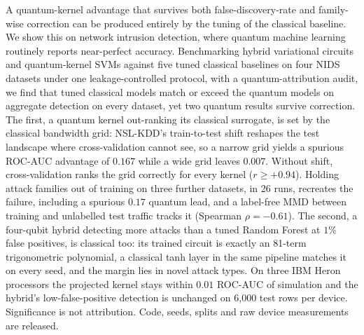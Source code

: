 A quantum-kernel advantage that survives both false-discovery-rate and family-wise correction can be
produced entirely by the tuning of the classical baseline. We show this on network intrusion detection,
where quantum machine learning routinely reports near-perfect accuracy. Benchmarking hybrid variational
circuits and quantum-kernel SVMs against five tuned classical baselines on four NIDS datasets under one
leakage-controlled protocol, with a quantum-attribution audit, we find that tuned classical models match
or exceed the quantum models on aggregate detection on every dataset, yet two quantum results survive
correction. The first, a quantum kernel out-ranking its classical surrogate, is set by the classical
bandwidth grid: NSL-KDD's train-to-test shift reshapes the test landscape where cross-validation cannot
see, so a narrow grid yields a spurious ROC-AUC advantage of $0.167$ while a wide grid leaves $0.007$.
Without shift, cross-validation ranks the grid correctly for every kernel ($r\ge+0.94$). Holding attack
families out of training on three further datasets, in 26 runs, recreates the failure, including a
spurious $0.17$ quantum lead, and a label-free MMD between training and unlabelled test traffic tracks it
(Spearman $\rho=-0.61$). The second, a four-qubit hybrid detecting more attacks than a tuned Random Forest at $1\%$
false positives, is classical too: its trained circuit is exactly an 81-term trigonometric polynomial,
a classical tanh layer in the same pipeline matches it on every seed, and the margin lies in novel attack
types. On three IBM Heron processors the projected kernel stays within $0.01$ ROC-AUC of simulation and
the hybrid's low-false-positive detection is unchanged on 6{,}000 test rows per device. Significance is
not attribution. Code, seeds, splits and raw device measurements are released.
